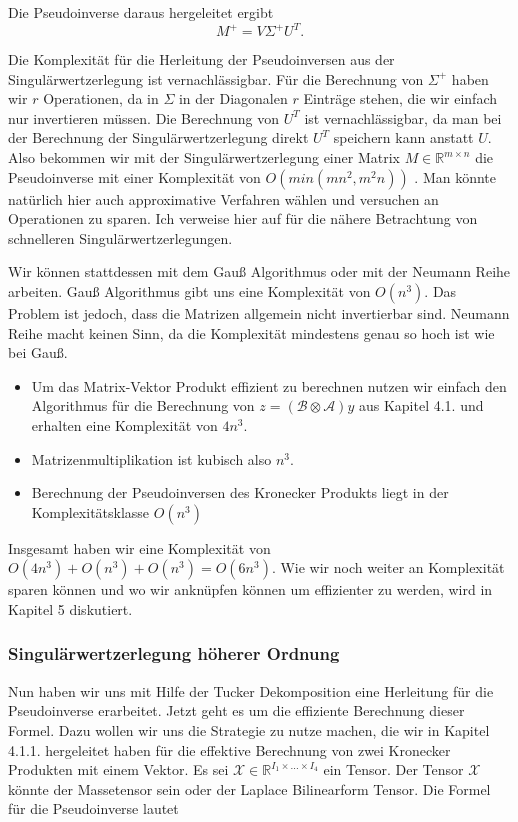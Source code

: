 Die Pseudoinverse daraus hergeleitet ergibt
\begin{equation*}
M^{+}=V\Sigma ^{+}U^{T}.
\end{equation*}

Die Komplexität für die Herleitung der Pseudoinversen aus der Singulärwertzerlegung ist vernachlässigbar. Für die Berechnung von $\Sigma^+$ haben wir $r$ Operationen, da in $\Sigma$ in der Diagonalen $r$ Einträge stehen, die wir einfach nur invertieren müssen. Die Berechnung von $U^{T}$ ist vernachlässigbar, da man bei der Berechnung der Singulärwertzerlegung direkt $U^{T}$ speichern kann anstatt $U$.
Also bekommen wir mit der Singulärwertzerlegung einer Matrix $M \in \mathbb{R}^{m \times n}$ die Pseudoinverse mit einer Komplexität von $O(min(mn^2,m^2 n))$ \cite[2]{SVD}. Man könnte natürlich hier auch approximative Verfahren wählen und versuchen an Operationen zu sparen. Ich verweise hier auf \cite{SVD} für die nähere Betrachtung von schnelleren Singulärwertzerlegungen.


Wir können stattdessen mit dem Gauß Algorithmus oder mit der Neumann Reihe arbeiten. Gauß Algorithmus gibt uns eine Komplexität von $O(n^3)$. Das Problem ist jedoch, dass die Matrizen allgemein nicht invertierbar sind. 
Neumann Reihe macht keinen Sinn, da die Komplexität mindestens genau so hoch ist wie bei Gauß.

\begin{itemize}
\item Um das Matrix-Vektor Produkt effizient zu berechnen nutzen wir einfach den Algorithmus für die Berechnung von $z=(\mathcal{B} \otimes \mathcal{A})y$ aus Kapitel 4.1. und erhalten eine Komplexität von $4n^3$.

\item Matrizenmultiplikation ist kubisch also $n^3$. 

\item Berechnung der Pseudoinversen des Kronecker Produkts liegt in der Komplexitätsklasse $O(n^3)$

\end{itemize}

Insgesamt haben wir eine Komplexität von $O(4n^3)+O(n^3)+O(n^3)=O(6n^3)$.
Wie wir noch weiter an Komplexität sparen können und wo wir anknüpfen können um effizienter zu werden, wird in Kapitel 5 diskutiert.

\subsubsection{Singulärwertzerlegung höherer Ordnung}
Nun haben wir uns mit Hilfe der Tucker Dekomposition eine Herleitung für die Pseudoinverse erarbeitet. Jetzt geht es um die effiziente Berechnung dieser Formel. Dazu wollen wir uns die Strategie zu nutze machen, die wir in Kapitel 4.1.1. hergeleitet haben für die effektive Berechnung von zwei Kronecker Produkten mit einem Vektor.
Es sei $\mathscr{X} \in \mathbb{R}^{I_{1} \times \dots \times I_{4}}$ ein Tensor. Der Tensor $\mathscr{X}$ könnte der Massetensor sein oder der Laplace Bilinearform Tensor.
Die Formel für die Pseudoinverse lautet


